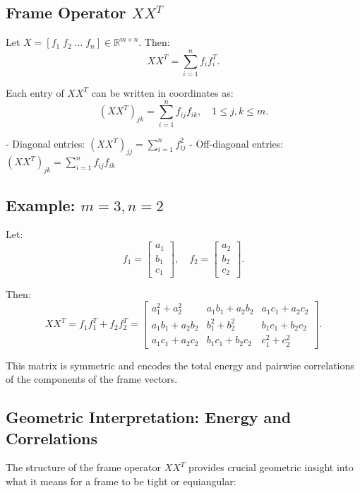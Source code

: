 \documentclass[12pt]{article}
\begin{document}
\subsection{Frame Operator \( XX^T \)}

Let \( X = [f_1 \; f_2 \; \dots \; f_n] \in \mathbb{R}^{m \times n} \). Then:
\[
XX^T = \sum_{i=1}^n f_i f_i^T.
\]

Each entry of \( XX^T \) can be written in coordinates as:
\[
(XX^T)_{jk} = \sum_{i=1}^n f_{ij} f_{ik}, \quad 1 \leq j,k \leq m.
\]

- Diagonal entries: \( (XX^T)_{jj} = \sum_{i=1}^n f_{ij}^2 \)
- Off-diagonal entries: \( (XX^T)_{jk} = \sum_{i=1}^n f_{ij} f_{ik} \)

\subsection{Example: \( m = 3, n = 2 \)}

Let:
\[
f_1 = \begin{bmatrix} a_1 \\ b_1 \\ c_1 \end{bmatrix},
\quad
f_2 = \begin{bmatrix} a_2 \\ b_2 \\ c_2 \end{bmatrix}.
\]

Then:
\[
XX^T = f_1 f_1^T + f_2 f_2^T =
\begin{bmatrix}
a_1^2 + a_2^2 & a_1 b_1 + a_2 b_2 & a_1 c_1 + a_2 c_2 \\
a_1 b_1 + a_2 b_2 & b_1^2 + b_2^2 & b_1 c_1 + b_2 c_2 \\
a_1 c_1 + a_2 c_2 & b_1 c_1 + b_2 c_2 & c_1^2 + c_2^2
\end{bmatrix}.
\]

This matrix is symmetric and encodes the total energy and pairwise correlations of the components of the frame vectors.

\subsection{Geometric Interpretation: Energy and Correlations}

The structure of the frame operator $XX^T$ provides crucial geometric insight into what it means for a frame to be tight or equiangular:
\end{document}
